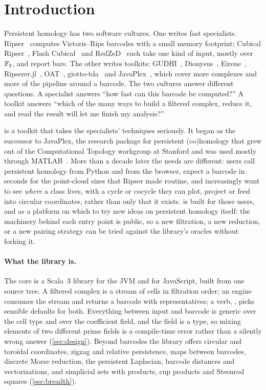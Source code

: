 \section{Introduction}\label{sec:intro}

Persistent homology has two software cultures. One writes fast specialists. Ripser~\cite{bauer2021ripser} computes
Vietoris--Rips barcodes with a small memory footprint; Cubical Ripser~\cite{kaji2020cubical}, Flash
Cubical~\cite{lebreton2026flash} and RedZeD~\cite{kapulkin2026redzed} each take one kind of input, mostly over $\mathbb{F}_2$, and
report bars. The other writes toolkits: GUDHI~\cite{gudhi2014}, Dionysus~\cite{dionysus2}, Eirene~\cite{henselman2016matroid},
Ripserer.jl~\cite{cufar2020ripserer}, OAT~\cite{hang2021umatch}, giotto-tda~\cite{tauzin2020gtda} and JavaPlex~\cite{tausz2014javaplex},
which cover more complexes and more of the pipeline around a barcode. The two cultures answer different questions. A
specialist answers ``how fast can this barcode be computed?'' A toolkit answers ``which of the many ways to build a
filtered complex, reduce it, and read the result will let me finish my analysis?''

\tdaj{} is a toolkit that takes the specialists' techniques seriously. It began as the successor to JavaPlex, the
research package for persistent (co)homology that grew out of the Computational Topology workgroup at Stanford and was
used mostly through MATLAB~\cite{tausz2014javaplex}. More than a decade later the needs are different: users call persistent homology
from Python and from the browser, expect a barcode in seconds for the point-cloud sizes that Ripser made routine, and
increasingly want to see \emph{where} a class lives, with a cycle or cocycle they can plot, project or feed into
circular coordinates, rather than only that it exists. \tdaj{} is built for those users, and as a platform on which to try
new ideas on persistent homology itself: the machinery behind each entry point is public, so a new filtration, a new
reduction, or a new pairing strategy can be tried against the library's oracles without forking it.

\paragraph{What the library is.}
The core is a Scala~3 library for the JVM and for JavaScript, built from one source tree. A filtered complex is a stream
of cells in filtration order; an engine consumes the stream and returns a barcode with representatives; a verb,
, picks sensible defaults for both. Everything between input and barcode is generic over the
cell type and over the coefficient field, and the field is a type, so mixing elements of two different prime fields is a compile-time
error rather than a silently wrong answer (\cref{sec:design}). Beyond barcodes the library offers circular and toroidal
coordinates, zigzag and relative persistence, maps between barcodes, discrete Morse reduction, the persistent Laplacian,
barcode distances and vectorizations, and simplicial sets with products, cup products and Steenrod squares
(\cref{sec:breadth}).

